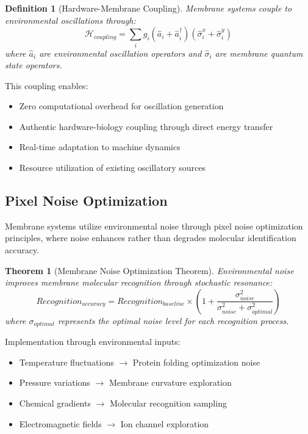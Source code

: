 \documentclass[12pt,a4paper]{article}
\newtheorem{theorem}{Theorem}
\newtheorem{definition}{Definition}
\begin{document}
\begin{definition}[Hardware-Membrane Coupling]
Membrane systems couple to environmental oscillations through:
\begin{equation}
\mathcal{H}_{coupling} = \sum_i g_i (\hat{a}_i + \hat{a}_i^\dagger)(\hat{\sigma}^x_i + \hat{\sigma}^y_i)
\end{equation}
where $\hat{a}_i$ are environmental oscillation operators and $\hat{\sigma}_i$ are membrane quantum state operators.
\end{definition}

This coupling enables:
\begin{itemize}
\item Zero computational overhead for oscillation generation
\item Authentic hardware-biology coupling through direct energy transfer
\item Real-time adaptation to machine dynamics
\item Resource utilization of existing oscillatory sources
\end{itemize}

\subsection{Pixel Noise Optimization}

Membrane systems utilize environmental noise through pixel noise optimization principles, where noise enhances rather than degrades molecular identification accuracy.

\begin{theorem}[Membrane Noise Optimization Theorem]
Environmental noise improves membrane molecular recognition through stochastic resonance:
\begin{equation}
Recognition_{accuracy} = Recognition_{baseline} \times \left(1 + \frac{\sigma_{noise}^2}{\sigma_{noise}^2 + \sigma_{optimal}^2}\right)
\end{equation}
where $\sigma_{optimal}$ represents the optimal noise level for each recognition process.
\end{theorem}

Implementation through environmental inputs:
\begin{itemize}
\item Temperature fluctuations $\rightarrow$ Protein folding optimization noise
\item Pressure variations $\rightarrow$ Membrane curvature exploration
\item Chemical gradients $\rightarrow$ Molecular recognition sampling
\item Electromagnetic fields $\rightarrow$ Ion channel exploration
\end{itemize}
\end{document}
